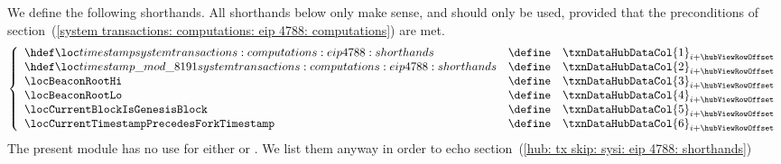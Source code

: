 We define the following shorthands.
All shorthands below only make sense, and should only be used, provided that the preconditions of
section~(\ref{system transactions: computations: eip 4788: computations})
are met.
\[
	\left\{ \begin{array}{lcl}
		\locLineaTimestamp                        & \define & \txnDataHubDataCol {1} _{i + \hubViewRowOffset} \\
		\locLineaTimestampModuloPrime             & \define & \txnDataHubDataCol {2} _{i + \hubViewRowOffset} \\
		\locBeaconRootHi                          & \define & \txnDataHubDataCol {3} _{i + \hubViewRowOffset} \\
		\locBeaconRootLo                          & \define & \txnDataHubDataCol {4} _{i + \hubViewRowOffset} \\
		\locCurrentBlockIsGenesisBlock            & \define & \txnDataHubDataCol {5} _{i + \hubViewRowOffset} \\
		\locCurrentTimestampPrecedesForkTimestamp & \define & \txnDataHubDataCol {6} _{i + \hubViewRowOffset} \\
	\end{array} \right.
\]
\saNote{}
The present module has no use for either
\locBeaconRootHi{} or
\locBeaconRootLo{}.
We list them anyway in order to echo
section~(\ref{hub: tx skip: sysi: eip 4788: shorthands})
